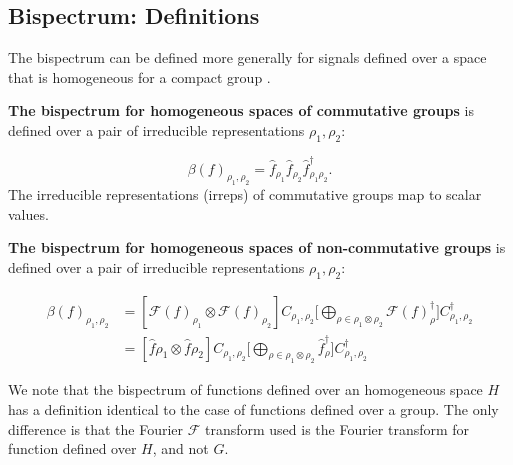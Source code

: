 \documentclass{article}
\begin{document}
\subsection{Bispectrum: Definitions}

The bispectrum can be defined more generally for signals defined over a space that is homogeneous for a compact group \cite{kakarala2012bispectrum}.

\textbf{The bispectrum for homogeneous spaces of commutative groups} is defined over a pair of irreducible representations $\rho_1, \rho_2$:

\begin{equation}
    \beta (f)_{\rho_1, \rho_2} = \hat{f}_{\rho_1}\hat{f}_{\rho_2}\hat{f}_{\rho_1 \rho_2}^{\dagger}.
    \label{eqn:group-bs}
\end{equation}
The irreducible representations (irreps) of commutative groups map to scalar values.

\textbf{The bispectrum for homogeneous spaces of non-commutative groups} is defined over a pair of irreducible representations $\rho_1, \rho_2$:

\begin{align*}
   \beta (f)_{\rho_1, \rho_2}
   &= [\mathcal{F}(f)_{\rho_1} \otimes \mathcal{F}(f)_{\rho_2}] C_{\rho_1,\rho_2} \Big[ \bigoplus_{\rho \in \rho_1 \otimes \rho_2} \mathcal{F}(f)_{\rho}^{\dagger} \Big] C^{\dagger}_{\rho_1,\rho_2}\\
   &= [\hat{f}{\rho_1} \otimes \hat{f}{\rho_2}] C_{\rho_1,\rho_2} \Big[ \bigoplus_{\rho \in \rho_1 \otimes \rho_2} \hat{f}_{\rho}^{\dagger} \Big] C^{\dagger}_{\rho_1,\rho_2}
    \label{eqn:non-commutative-bs}
\end{align*}

We note that the bispectrum of functions defined over an homogeneous space $H$ has a definition identical to the case of functions defined over a group. The only difference is that the Fourier $\mathcal{F}$ transform used is the Fourier transform for function defined over $H$, and not $G$.
\end{document}
